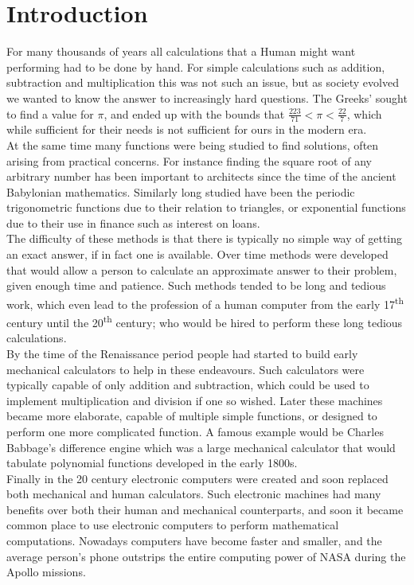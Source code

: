 \section{Introduction}
\label{SEC_"Introduction"}
For many thousands of years all calculations that a Human might want performing had to be done by hand. For simple calculations such as addition, subtraction and multiplication this was not such an issue, but as society evolved we wanted to know the answer to increasingly hard questions. The Greeks' sought to find a value for $\pi$, and ended up with the bounds that $\frac{223}{71} < \pi < \frac{22}{7}$, which while sufficient for their needs is not sufficient for ours in the modern era. \\

At the same time many functions were being studied to find solutions, often arising from practical concerns. For instance finding the square root of any arbitrary number has been important to architects since the time of the ancient Babylonian mathematics. Similarly long studied have been the periodic trigonometric functions due to their relation to triangles, or exponential functions due to their use in finance such as interest on loans.\\

The difficulty of these methods is that there is typically no simple way of getting an exact answer, if in fact one is available. Over time methods were developed that would allow a person to calculate an approximate answer to their problem, given enough time and patience. Such methods tended to be long and tedious work, which even lead to the profession of a human computer from the early 17\textsuperscript{th} century until the 20\textsuperscript{th} century; who would be hired to perform these long tedious calculations.\\

By the time of the Renaissance period people had started to build early mechanical calculators to help in these endeavours. Such calculators were typically capable of only addition and subtraction, which could be used to implement multiplication and division if one so wished. Later these machines became more elaborate, capable of multiple simple functions, or designed to perform one more complicated function. A famous example would be Charles Babbage's difference engine which was a large mechanical calculator that would tabulate polynomial functions developed in the early 1800s.\\

Finally in the 20 century electronic computers were created and soon replaced both mechanical and human calculators. Such electronic machines had many benefits over both their human and mechanical counterparts, and soon it became common place to use electronic computers to perform mathematical computations. Nowadays computers have become faster and smaller, and the average person's phone outstrips the entire computing power of NASA during the Apollo missions.\\

